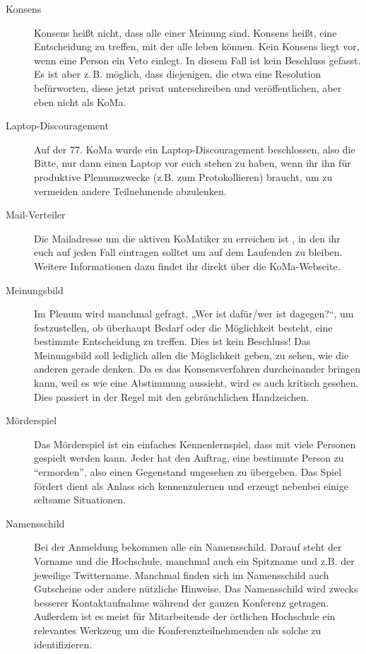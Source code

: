 \begin{description}
\item[Konsens]
    Konsens heißt nicht, dass alle einer Meinung sind. Konsens heißt, eine Entscheidung zu treffen, mit der alle leben können. Kein Konsens liegt vor, wenn eine Person ein Veto einlegt. In diesem Fall ist kein Beschluss gefasst.  Es ist aber z.\,B. möglich, dass diejenigen, die etwa eine Resolution befürworten, diese jetzt privat unterschreiben und veröffentlichen, aber eben nicht als KoMa.

\item[Laptop-Discouragement]
    Auf der 77. KoMa wurde ein Laptop-Discouragement beschlossen, also die Bitte,     nur dann einen Laptop vor euch stehen zu haben, wenn ihr ihn für produktive Plenumszwecke (z.B. zum       Protokollieren) braucht, um zu vermeiden andere Teilnehmende abzulenken.

\item[Mail-Verteiler]
    Die Mailadresse um die aktiven KoMatiker zu erreichen ist , in den ihr euch auf jeden Fall eintragen solltet um auf dem Laufenden zu bleiben. Weitere Informationen dazu findet ihr direkt über die KoMa-Webseite.

\item[Meinungsbild]
    Im Plenum wird manchmal gefragt, „Wer ist dafür/wer ist dagegen?“, um festzustellen, ob überhaupt Bedarf oder die Möglichkeit besteht, eine bestimmte Entscheidung zu treffen. Dies ist kein Beschluss! Das Meinungsbild soll lediglich allen die Möglichkeit geben, zu sehen, wie die anderen gerade denken. Da es das Konsensverfahren durcheinander bringen kann, weil es wie eine Abstimmung aussieht, wird es auch kritisch gesehen. Dies passiert in der Regel mit den gebräuchlichen Handzeichen.

\item[Mörderspiel]
    Das Mörderspiel ist ein einfaches Kennenlernspiel, dass mit viele Personen gespielt werden kann. Jeder hat den Auftrag, eine bestimmte Person zu \enquote{ermorden}, also einen Gegenstand ungesehen zu übergeben.
    Das Spiel fördert dient als Anlass sich kennenzulernen und erzeugt nebenbei einige seltsame Situationen.
    
\item[Namensschild]
    Bei der Anmeldung bekommen alle ein	Namensschild. Darauf steht der Vorname und die Hochschule, manchmal auch ein Spitzname und z.B. der jeweilige Twittername. Manchmal finden sich im Namensschild auch Gutscheine oder andere nützliche Hinweise. Das Namensschild wird zwecks besserer Kontaktaufnahme während der ganzen Konferenz getragen. Außerdem ist es meist für Mitarbeitende der örtlichen Hochschule ein relevantes Werkzeug um die Konferenzteilnehmenden als solche zu identifizieren.


\end{description}
